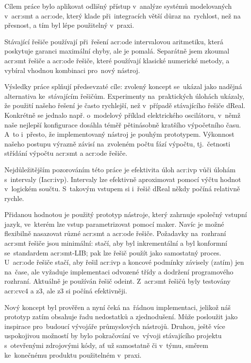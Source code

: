 \documentclass[thesis=M,czech]{FITthesis}[2012/06/26]
\newcommand{\acrlabel}[1]{acr:#1}
\newcommand{\acr}[1]{\acrshort{\acrlabel{#1}}}
\begin{document}

\begin{conclusion}\label{ch:outro}
Cílem práce bylo aplikovat odlišný přístup
v~analýze systémů modelovaných
v~\acr{smt} a \acr{ode},
který klade při~integracích větší
důraz na~rychlost, než na přesnost,
a tím byl lépe použitelný v~praxi.

Stávající řešiče používají při~řešení \acr{ode}
intervalovou aritmetiku, která poskytuje
garanci maximální chyby,
ale je pomalá.
Separátně jsem zkoumal \acr{smt} řešiče
a \acr{ode} řešiče, které používají
klasické numerické metody,
a vybíral vhodnou kombinaci
pro~nový nástroj.

Výsledky práce splňují předsevzaté cíle:
zvolený koncept se~ukázal jako nadějná
alternativa ke~stávajícím řešičům.
Experimenty na~praktických úlohách ukázaly,
že použití našeho řešení
je často rychlejší,
než v~případě stávajícího řešiče dReal.
Konkrétně se jednalo např. o~modelový příklad
elektrického oscilátoru,
v~němž naše nejlepší konfigurace dosáhla
téměř pětinásobně kratšího výpočetního času.
A~to i~přesto, že implementovaný nástroj
je pouhým prototypem.
Výkonnost našeho postupu výrazně závisí
na~zvoleném počtu fází výpočtu,
tj.~četnosti střídání výpočtu \acr{smt} a \acr{ode} řešiče.

Nejdůležitějším pozorováním této práce
je efektivita úloh \acr{ivp}
vůči úlohám s~intervaly (I\acr{ivp}).
Intervaly lze efektivně aproximovat
pomocí výčtu hodnot v~logickém součtu.
S~takovým vstupem si i~řešič dReal
někdy počíná relativně rychle.

Přidanou hodnotou je použitý prototyp nástroje,
který zahrnuje společný vstupní jazyk,
ve~kterém lze vstup parametrizovat pomocí maker.
Navíc je možné flexibilně
nasazovat různé \acr{smt} a \acr{ode} řešiče.
Požadavky na~rozhraní \acr{smt} řešiče
jsou minimální: stačí, aby byl inkrementální
a byl konformní se~standardem \acr{smt}-LIB;
pak lze řešič použít jako samostatný proces.
U~\acr{ode} řešiče stačí, aby řešil \acr{ivp}
a koncové podmínky závisely (zatím) jen na~čase,
ale vyžaduje implementaci
odvozené třídy a dodržení programového rozhraní.
Aktuálně je používán řešič odeint.
Z~\acr{smt} řešičů byly testovány
\acr{cvc}4 a z3,
ale z3 si počíná efektivněji.

Nový koncept byl prověřen a nyní čeká
na~řádnou implementaci,
jelikož náš prototyp zatím obsahuje řadu nedostatků a zjednodušení.
Může posloužit jako inspirace pro~budoucí vývojáře
průmyslových nástrojů.
Druhou, ještě více uspokojivou možností
by bylo pokračování ve~vývoji stávajícího projektu
s~otevřenými zdrojovými kódy,
ať už samostatně či v~týmu,
směrem ke~konečnému produktu použitelném v~praxi.
\end{conclusion}
\end{document}
